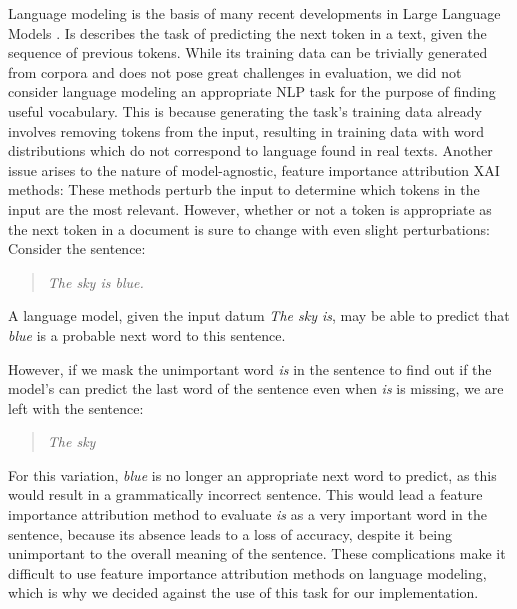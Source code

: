 Language modeling is the basis of many recent developments in Large Language Models \cite{brownLanguageModelsAre2020} \cite{openaiGPT4TechnicalReport2024} .
Is describes the task of predicting the next token in a text, given the sequence of previous tokens.
While its training data can be trivially generated from corpora and does not pose great challenges in evaluation, we did not consider language modeling an appropriate NLP task for the purpose of finding useful vocabulary.
This is because generating the task's training data already involves removing tokens from the input, resulting in training data with word distributions which do not correspond to language found in real texts.
Another issue arises to the nature of model-agnostic, feature importance attribution XAI methods:
These methods perturb the input to determine which tokens in the input are the most relevant.
However, whether or not a token is appropriate as the next token in a document is sure to change with even slight perturbations:
Consider the sentence:

\begin{quote}
	\textit{The sky is blue.}
\end{quote}

A language model, given the input datum \textit{The sky is}, may be able to predict that \textit{blue} is a probable next word to this sentence.

However, if we mask the unimportant word  \textit{is} in the sentence to find out if the model's can predict the last word of the sentence even when \textit{is} is missing, we are left with the sentence:

\begin{quote}
	\textit{The sky}
\end{quote}

For this variation, \textit{blue} is no longer an appropriate next word to predict, as this would result in a grammatically incorrect sentence.
This would lead a feature importance attribution method to evaluate \textit{is} as a very important word in the sentence, because its absence leads to a loss of accuracy, despite it being unimportant to the overall meaning of the sentence.
These complications make it difficult to use feature importance attribution methods on language modeling, which is why we decided against the use of this task for our implementation.


